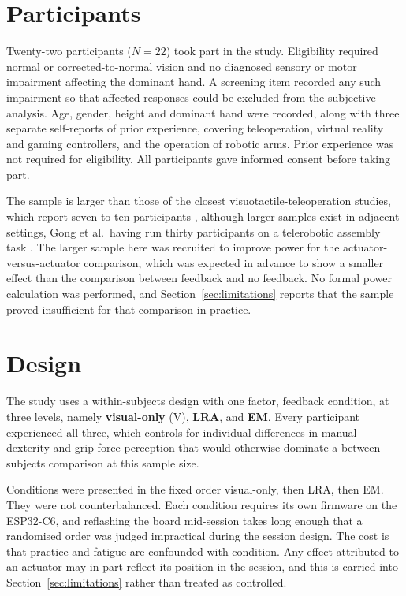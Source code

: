\documentclass[12pt, a4paper, twoside, openright]{report}
\begin{document}
\section{Participants}
\label{sec:participants}

Twenty-two participants ($N=22$) took part in the study. Eligibility required
normal or corrected-to-normal vision and no diagnosed sensory or motor
impairment affecting the dominant hand. A screening item recorded any such
impairment so that affected responses could be excluded from the subjective
analysis. Age, gender, height and dominant hand were recorded, along with three
separate self-reports of prior experience, covering teleoperation, virtual
reality and gaming controllers, and the operation of robotic arms. Prior
experience was not required for eligibility. All participants gave informed
consent before taking part.

The sample is larger than those of the closest visuotactile-teleoperation
studies, which report seven to ten participants \cite{becker2024,coppola2022},
although larger samples exist in adjacent settings, Gong et al.\ having run
thirty participants on a telerobotic assembly task \cite{gong2024}. The larger
sample here was recruited to improve power for the actuator-versus-actuator
comparison, which was expected in advance to show a smaller effect than the
comparison between feedback and no feedback. No formal power calculation was
performed, and Section~\ref{sec:limitations} reports that the sample proved
insufficient for that comparison in practice.

\section{Design}
\label{sec:design}

The study uses a within-subjects design with one factor, feedback condition, at
three levels, namely \textbf{visual-only} (V), \textbf{LRA}, and \textbf{EM}.
Every participant experienced all three, which controls for individual
differences in manual dexterity and grip-force perception that would otherwise
dominate a between-subjects comparison at this sample size.

Conditions were presented in the fixed order visual-only, then LRA, then EM.
They were not counterbalanced. Each condition requires its own firmware on the
ESP32-C6, and reflashing the board mid-session takes long enough that a
randomised order was judged impractical during the session design. The cost is
that practice and fatigue are confounded with condition. Any effect attributed
to an actuator may in part reflect its position in the session, and this is
carried into Section~\ref{sec:limitations} rather than treated as controlled.
\end{document}
